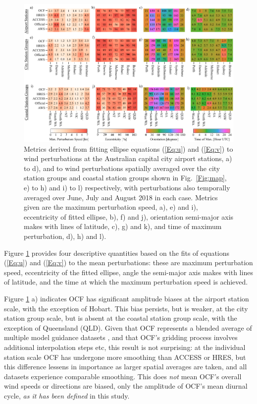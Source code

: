 \documentclass[twocol]{ametsoc}
\begin{document}
\begin{figure}
\centering
\includegraphics[width=39pc]{ellipse_fits.pdf}
\caption{Metrics derived from fitting ellipse equations (\ref{Eq:u}) and (\ref{Eq:v}) to wind perturbations at the Australian capital city airport stations, a) to d), and to wind perturbations spatially averaged over the city station groups and coastal station groups shown in Fig.~\ref{Fig:map}, e) to h) and i) to l) respectively, with perturbations also temporally averaged over June, July and August 2018 in each case. Metrics given are the maximum perturbation speed, a), e) and i), eccentricity of fitted ellipse, b), f) and j), orientation semi-major axis makes with lines of latitude, c), g) and k), and time of maximum perturbation, d), h) and l).}
\label{Fig:ellipse_fits}
\end{figure}

Figure \ref{Fig:ellipse_fits} provides four descriptive quantities based on the fits of equations (\ref{Eq:u}) and (\ref{Eq:v}) to the mean perturbations: these are maximum perturbation speed, eccentricity of the fitted ellipse, angle the semi-major axis makes with lines of latitude, and the time at which the maximum perturbation speed is achieved. 

Figure \ref{Fig:ellipse_fits} a) indicates OCF has significant amplitude biases at the airport station scale, with the exception of Hobart. This bias persists, but is weaker, at the city station group scale, but is absent at the coastal station group scale, with the exception of  Queensland (QLD). Given that OCF represents a blended average of multiple model guidance datasets \citep{engel07}, and that OCF's gridding process involves additional interpolation steps \citep{bom10} etc, this result is not surprising: at the individual station scale OCF has undergone more smoothing than ACCESS or HRES, but this difference lessens in importance as larger spatial averages are taken, and all datasets experience comparable smoothing. This does \textit{not} mean OCF's overall wind speeds or directions are biased, only the amplitude of OCF's mean diurnal cycle, \textit{as it has been defined} in this study. 
\end{document}
